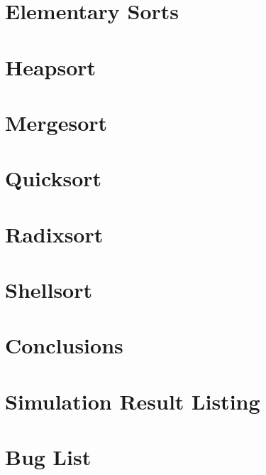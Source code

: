 \documentclass{report}
\begin{document}


\chapter{Elementary Sorts}



\chapter{Heapsort}



\chapter{Mergesort}



\chapter{Quicksort}



\chapter{Radixsort}



\chapter{Shellsort}



\chapter{Conclusions}



\appendix

\chapter{Simulation Result Listing}


%

\chapter{Bug List}


\nocite{*}
\end{document}

